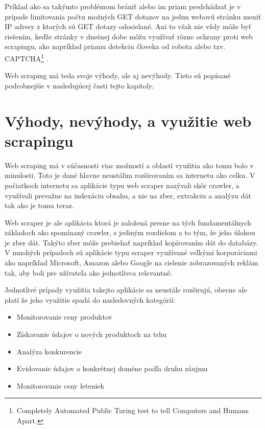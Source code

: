 Príklad ako sa takýmto problémom brániť alebo im priam predchádzať je v prípade limitovania počtu možných GET dotazov na jednu webovú stránku meniť IP adresy z ktorých sú GET dotazy odosielané. Ani to však nie vždy môže byť riešením, keďže stránky v dnešnej dobe môžu využívať rôzne ochrany proti web scrapingu, ako napríklad priamu detekciu človeka od robota alebo tzv. CAPTCHA\footnote{Completely Automated Public Turing test to tell Computers and Humans Apart.} .\cite{JanCurna:online} 

Web scraping má teda svoje výhody, ale aj nevýhody. Tieto sú popísané podrobnejšie v nasledujúcej časti tejto kapitoly.

\section{Výhody, nevýhody, a využitie web scrapingu}

Web scraping má v súčasnosti viac možností a oblastí využitia ako tomu bolo v minulosti. Toto je dané hlavne neustálim rozširovaním sa internetu ako celku. V počiatkoch internetu sa aplikácie typu web scraper nazývali skôr crawler, a využívali prevažne na indexáciu obsahu, a nie na zber, extrakciu a analýzu dát tak ako je tomu teraz. 

Web scraper je ale aplikácia ktorá je založená presne na tých fundamentálnych základoch ako spomínaný crawler, s jediným rozdielom a to tým, že jeho úlohou je zber dát. Takýto zber môže prebiehať napríklad kopírovaním dát do databázy. V mnohých prípadoch sú aplikácie typu scraper využívané veľkými korporáciami ako napríklad Microsoft, Amazon alebo Google na cielenie zobrazovaných reklám tak, aby boli pre užívateľa ako jednotlivca relevantné.\cite{online:how_does_scraping_work}

\bigskip

Jednotlivé prípady využitia takejto aplikácie sa neustále rozširujú, obecne ale platí že jeho využitie spadá do nasledovných kategórií:

\begin{itemize}
    \item {Monitorovanie ceny produktov}
    \item {Získavanie údajov o nových produktoch na trhu}
    \item {Analýza konkurencie}
    \item {Evidovanie údajov o konkrétnej doméne podľa druhu záujmu}
    \item {Monitorovanie ceny leteniek}
\end{itemize}

